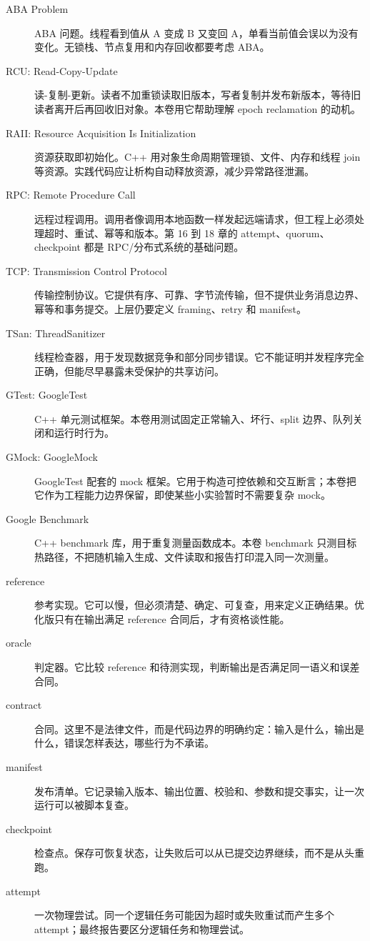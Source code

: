 \begin{description}
  \item[ABA Problem] ABA 问题。线程看到值从 A 变成 B 又变回 A，单看当前值会误以为没有变化。无锁栈、节点复用和内存回收都要考虑 ABA。
  \item[RCU: Read-Copy-Update] 读-复制-更新。读者不加重锁读取旧版本，写者复制并发布新版本，等待旧读者离开后再回收旧对象。本卷用它帮助理解 epoch reclamation 的动机。
  \item[RAII: Resource Acquisition Is Initialization] 资源获取即初始化。C++ 用对象生命周期管理锁、文件、内存和线程 join 等资源。实践代码应让析构自动释放资源，减少异常路径泄漏。
  \item[RPC: Remote Procedure Call] 远程过程调用。调用者像调用本地函数一样发起远端请求，但工程上必须处理超时、重试、幂等和版本。第 16 到 18 章的 attempt、quorum、checkpoint 都是 RPC/分布式系统的基础问题。
  \item[TCP: Transmission Control Protocol] 传输控制协议。它提供有序、可靠、字节流传输，但不提供业务消息边界、幂等和事务提交。上层仍要定义 framing、retry 和 manifest。
  \item[TSan: ThreadSanitizer] 线程检查器，用于发现数据竞争和部分同步错误。它不能证明并发程序完全正确，但能尽早暴露未受保护的共享访问。
  \item[GTest: GoogleTest] C++ 单元测试框架。本卷用测试固定正常输入、坏行、split 边界、队列关闭和运行时行为。
  \item[GMock: GoogleMock] GoogleTest 配套的 mock 框架。它用于构造可控依赖和交互断言；本卷把它作为工程能力边界保留，即使某些小实验暂时不需要复杂 mock。
  \item[Google Benchmark] C++ benchmark 库，用于重复测量函数成本。本卷 benchmark 只测目标热路径，不把随机输入生成、文件读取和报告打印混入同一次测量。
  \item[reference] 参考实现。它可以慢，但必须清楚、确定、可复查，用来定义正确结果。优化版只有在输出满足 reference 合同后，才有资格谈性能。
  \item[oracle] 判定器。它比较 reference 和待测实现，判断输出是否满足同一语义和误差合同。
  \item[contract] 合同。这里不是法律文件，而是代码边界的明确约定：输入是什么，输出是什么，错误怎样表达，哪些行为不承诺。
  \item[manifest] 发布清单。它记录输入版本、输出位置、校验和、参数和提交事实，让一次运行可以被脚本复查。
  \item[checkpoint] 检查点。保存可恢复状态，让失败后可以从已提交边界继续，而不是从头重跑。
  \item[attempt] 一次物理尝试。同一个逻辑任务可能因为超时或失败重试而产生多个 attempt；最终报告要区分逻辑任务和物理尝试。

\end{description}
